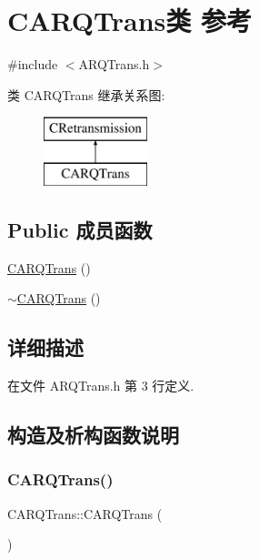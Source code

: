 \hypertarget{class_c_a_r_q_trans}{}\section{C\+A\+R\+Q\+Trans类 参考}
\label{class_c_a_r_q_trans}


{\ttfamily \#include $<$A\+R\+Q\+Trans.\+h$>$}

类 C\+A\+R\+Q\+Trans 继承关系图\+:\begin{figure}[H]
\begin{center}
\leavevmode
\includegraphics[height=2.000000cm]{class_c_a_r_q_trans}
\end{center}
\end{figure}
\subsection*{Public 成员函数}
\begin{DoxyCompactItemize}
\item 
\hyperlink{class_c_a_r_q_trans_a7a3ee0aa968cd4b72f43d648896333d9}{C\+A\+R\+Q\+Trans} ()
\item 
\hyperlink{class_c_a_r_q_trans_ac24aad04086bf8256bd36b6f8ab09512}{$\sim$\+C\+A\+R\+Q\+Trans} ()
\end{DoxyCompactItemize}


\subsection{详细描述}


在文件 A\+R\+Q\+Trans.\+h 第 3 行定义.



\subsection{构造及析构函数说明}
\mbox{\label{class_c_a_r_q_trans_a7a3ee0aa968cd4b72f43d648896333d9}} 
\subsubsection{\texorpdfstring{C\+A\+R\+Q\+Trans()}{CARQTrans()}}
{\footnotesize\ttfamily C\+A\+R\+Q\+Trans\+::\+C\+A\+R\+Q\+Trans (\begin{DoxyParamCaption}{ }\end{DoxyParamCaption})}



